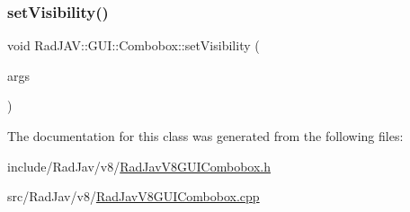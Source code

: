 \mbox{\label{class_rad_j_a_v_1_1_g_u_i_1_1_combobox_af607d7b4ad357fa8c24b334a5b4998e6}} 
\subsubsection{\texorpdfstring{set\+Visibility()}{setVisibility()}}
{\footnotesize\ttfamily void Rad\+J\+A\+V\+::\+G\+U\+I\+::\+Combobox\+::set\+Visibility (\begin{DoxyParamCaption}\item[{const v8\+::\+Function\+Callback\+Info$<$ v8\+::\+Value $>$ \&}]{args }\end{DoxyParamCaption})\hspace{0.3cm}{\ttfamily [static]}}



The documentation for this class was generated from the following files\+:\begin{DoxyCompactItemize}
\item 
include/\+Rad\+Jav/v8/\mbox{\hyperlink{_rad_jav_v8_g_u_i_combobox_8h}{Rad\+Jav\+V8\+G\+U\+I\+Combobox.\+h}}\item 
src/\+Rad\+Jav/v8/\mbox{\hyperlink{_rad_jav_v8_g_u_i_combobox_8cpp}{Rad\+Jav\+V8\+G\+U\+I\+Combobox.\+cpp}}\end{DoxyCompactItemize}
